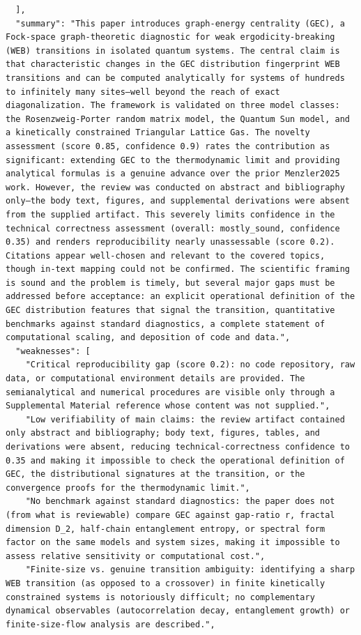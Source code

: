 \documentclass[11pt]{article}
\begin{document}
\begin{verbatim}
  ],
  "summary": "This paper introduces graph-energy centrality (GEC), a Fock-space graph-theoretic diagnostic for weak ergodicity-breaking (WEB) transitions in isolated quantum systems. The central claim is that characteristic changes in the GEC distribution fingerprint WEB transitions and can be computed analytically for systems of hundreds to infinitely many sites—well beyond the reach of exact diagonalization. The framework is validated on three model classes: the Rosenzweig-Porter random matrix model, the Quantum Sun model, and a kinetically constrained Triangular Lattice Gas. The novelty assessment (score 0.85, confidence 0.9) rates the contribution as significant: extending GEC to the thermodynamic limit and providing analytical formulas is a genuine advance over the prior Menzler2025 work. However, the review was conducted on abstract and bibliography only—the body text, figures, and supplemental derivations were absent from the supplied artifact. This severely limits confidence in the technical correctness assessment (overall: mostly_sound, confidence 0.35) and renders reproducibility nearly unassessable (score 0.2). Citations appear well-chosen and relevant to the covered topics, though in-text mapping could not be confirmed. The scientific framing is sound and the problem is timely, but several major gaps must be addressed before acceptance: an explicit operational definition of the GEC distribution features that signal the transition, quantitative benchmarks against standard diagnostics, a complete statement of computational scaling, and deposition of code and data.",
  "weaknesses": [
    "Critical reproducibility gap (score 0.2): no code repository, raw data, or computational environment details are provided. The semianalytical and numerical procedures are visible only through a Supplemental Material reference whose content was not supplied.",
    "Low verifiability of main claims: the review artifact contained only abstract and bibliography; body text, figures, tables, and derivations were absent, reducing technical-correctness confidence to 0.35 and making it impossible to check the operational definition of GEC, the distributional signatures at the transition, or the convergence proofs for the thermodynamic limit.",
    "No benchmark against standard diagnostics: the paper does not (from what is reviewable) compare GEC against gap-ratio r, fractal dimension D_2, half-chain entanglement entropy, or spectral form factor on the same models and system sizes, making it impossible to assess relative sensitivity or computational cost.",
    "Finite-size vs. genuine transition ambiguity: identifying a sharp WEB transition (as opposed to a crossover) in finite kinetically constrained systems is notoriously difficult; no complementary dynamical observables (autocorrelation decay, entanglement growth) or finite-size-flow analysis are described.",

\end{verbatim}
\end{document}
